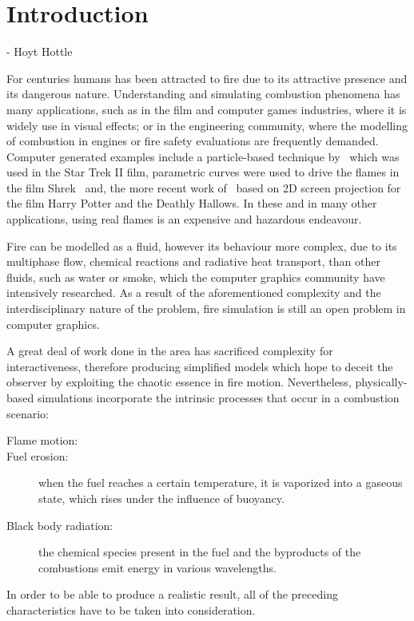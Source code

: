 \chapter{Introduction}
\label{ch:introduction}
 - Hoyt Hottle

For centuries humans has been attracted to fire due to its attractive presence and its dangerous nature.
Understanding and simulating combustion phenomena has many applications, such as in the film and computer games industries, where it is widely use in visual effects; or in the engineering community, where the modelling of combustion in engines or fire safety evaluations are frequently demanded.
Computer generated examples include a particle-based technique by~\cite{Reeves:1983} which was used in the Star Trek II film, parametric curves were used to drive the flames in the film Shrek~\cite{Lamorlette:2002} and, the more recent work of~\cite{Horvath:2009} based on 2D screen projection for the film Harry Potter and the Deathly Hallows.
In these and in many other applications, using real flames is an expensive and hazardous endeavour.


Fire can be modelled as a fluid, however its behaviour more complex, due to its multiphase flow, chemical reactions and radiative heat transport, than other fluids, such as water or smoke, which the computer graphics community have intensively researched.
As a result of the aforementioned complexity and the interdisciplinary nature of the problem, fire simulation is still an open problem in computer graphics.

A great deal of work done in the area has sacrificed complexity for interactiveness, therefore producing simplified models which hope to deceit the observer by exploiting the chaotic essence in fire motion.
Nevertheless, physically-based simulations incorporate the intrinsic processes that occur in a combustion scenario:

\begin{description}
\item[Flame motion:]
\item[Fuel erosion:] when the fuel reaches a certain temperature, it is vaporized into a gaseous state, which rises under the influence of buoyancy.
\item[Black body radiation:] the chemical species present in the fuel and the byproducts of the combustions emit energy in various wavelengths.
\end{description}

In order to be able to produce a realistic result, all of the preceding characteristics have to be taken into consideration.